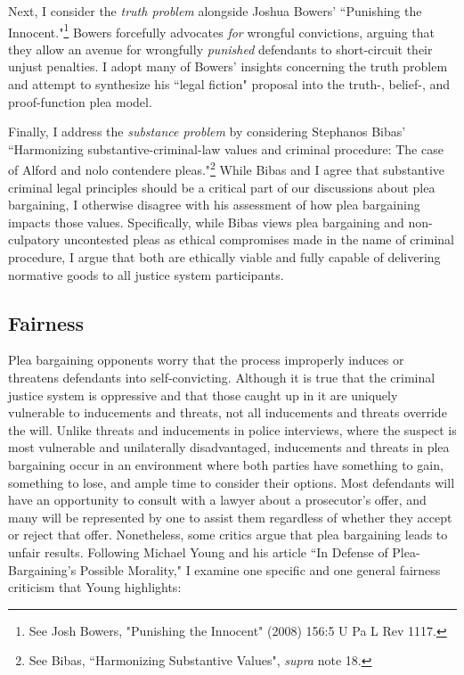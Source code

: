 Next, I consider the \textit{truth problem} alongside Joshua Bowers' ``Punishing the Innocent."\footnote{See Josh Bowers, "Punishing the Innocent" (2008) 156:5 U Pa L Rev 1117.} Bowers forcefully advocates \textit{for} wrongful convictions, arguing that they allow an avenue for wrongfully \textit{punished} defendants to short-circuit their unjust penalties. I adopt many of Bowers' insights concerning the truth problem and attempt to synthesize his ``legal fiction" proposal into the truth-, belief-, and proof-function plea model. 

Finally, I address the \textit{substance problem} by considering Stephanos Bibas' ``Harmonizing substantive-criminal-law values and criminal procedure: The case of Alford and nolo contendere pleas."\footnote{See Bibas, ``Harmonizing Substantive Values", \textit{supra} note 18.} While Bibas and I agree that substantive criminal legal principles should be a critical part of our discussions about plea bargaining, I otherwise disagree with his assessment of how plea bargaining impacts those values. Specifically, while Bibas views plea bargaining and non-culpatory uncontested pleas as ethical compromises made in the name of criminal procedure, I argue that both are ethically viable and fully capable of delivering normative goods to all justice system participants.

\subsection{Fairness}

Plea bargaining opponents worry that the process improperly induces or threatens defendants into self-convicting. Although it is true that the criminal justice system is oppressive and that those caught up in it are uniquely vulnerable to inducements and threats, not all inducements and threats override the will. Unlike threats and inducements in police interviews, where the suspect is most vulnerable and unilaterally disadvantaged, inducements and threats in plea bargaining occur in an environment where both parties have something to gain, something to lose, and ample time to consider their options. Most defendants will have an opportunity to consult with a lawyer about a prosecutor's offer, and many will be represented by one to assist them regardless of whether they accept or reject that offer. Nonetheless, some critics argue that plea bargaining leads to unfair results. Following Michael Young and his article ``In Defense of Plea-Bargaining's Possible Morality," I examine one specific and one general fairness criticism that Young highlights:

